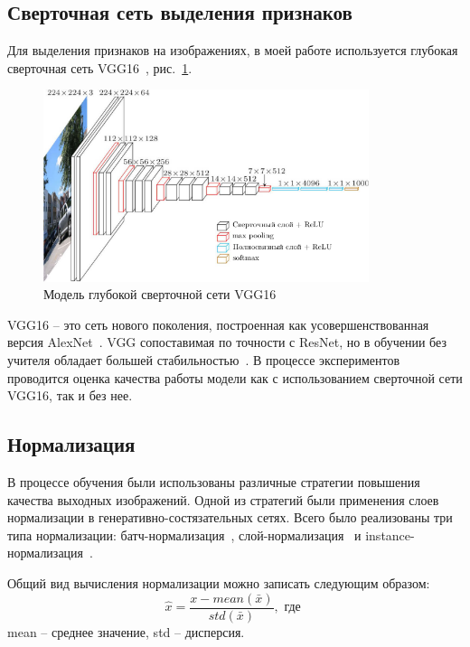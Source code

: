 \documentclass[11pt,a4paper]{extarticle}
\begin{document}
{		\subsection{Сверточная сеть выделения признаков}\label{sec:model:vgg}
			 
			Для выделения признаков на изображениях, в моей работе используется глубокая сверточная сеть VGG16~\cite{vgg}, рис.~\ref{pic:vgg16}.

			\begin{figure}[ht]
				\centering
				\includegraphics[width=0.85\textwidth]{img/vgg16}
				\caption{Модель глубокой сверточной сети VGG16}
				\label{pic:vgg16}
			\end{figure}
			
			\noindent
			VGG16 -- это сеть нового поколения, построенная как усовершенствованная версия AlexNet~\cite{AlexNet}. 
			VGG сопоставимая по точности с ResNet, но в обучении без учителя обладает большей стабильностью~\cite{MUNIT}.
			В процессе экспериментов проводится оценка качества работы модели как с использованием сверточной сети VGG16, так и без нее.

		\subsection{Нормализация}\label{sec:model:norm}

			В процессе обучения были использованы различные стратегии повышения качества выходных изображений.
			Одной из стратегий были применения слоев нормализации в генеративно-состязательных сетях.
			Всего было реализованы три типа нормализации: батч-нормализация~\cite{n_batch}, слой-нормализация~\cite{n_layer} и instance-нормализация~\cite{n_instance}.

			\noindent
			Общий вид вычисления нормализации можно записать следующим образом:
			\begin{equation}\label{eq:norm}
				\hat{x} = \frac{x - mean(\bar{x})}{std(\bar{x})}, \text{ где }
			\end{equation}
			mean -- среднее значение, std -- дисперсия. 
			
}
\end{document}
